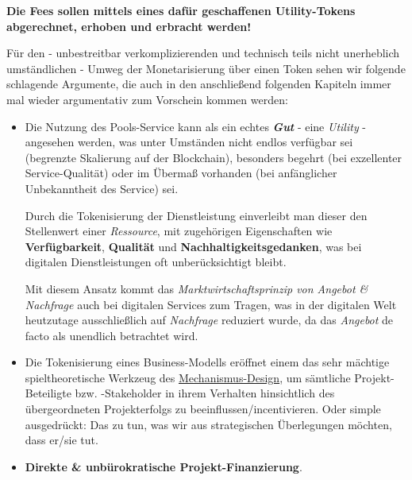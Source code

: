 \begin{Praemisse}

\vspace{0.2cm} 

\textbf{Die Fees sollen mittels eines dafür geschaffenen Utility-Tokens abgerechnet, erhoben und erbracht werden!}

\vspace{0.5cm} 

Für den - unbestreitbar verkomplizierenden und technisch teils nicht unerheblich umständlichen - Umweg der Monetarisierung über einen Token sehen wir folgende schlagende Argumente, die auch in den anschließend folgenden Kapiteln immer mal wieder argumentativ zum Vorschein kommen werden:

\begin{itemize}
	\item Die Nutzung des Pools-Service kann als ein echtes \textit{\textbf{Gut}} - eine \textit{Utility} - angesehen werden, was unter Umständen nicht endlos verfügbar sei (begrenzte Skalierung auf der Blockchain), besonders begehrt (bei exzellenter Service-Qualität) oder im Übermaß vorhanden (bei anfänglicher Unbekanntheit des Service) sei. 
	
	Durch die Tokenisierung der Dienstleistung einverleibt man dieser den Stellenwert einer \textit{Ressource}, mit zugehörigen Eigenschaften wie \textbf{Verfügbarkeit}, \textbf{Qualität} und \textbf{Nachhaltigkeitsgedanken}, was bei digitalen Dienstleistungen oft unberücksichtigt bleibt. 
	
	Mit diesem Ansatz kommt das \textit{Marktwirtschaftsprinzip von Angebot \& Nachfrage} auch bei digitalen Services zum Tragen, was in der digitalen Welt heutzutage ausschließlich auf \textit{Nachfrage} reduziert wurde, da das \textit{Angebot} de facto als unendlich betrachtet wird.
	\item Die Tokenisierung eines Business-Modells eröffnet einem das sehr mächtige spieltheoretische Werkzeug des \href{https://de.wikipedia.org/wiki/Mechanismus-Design-Theorie}{Mechanismus-Design}, um sämtliche Projekt-Beteiligte bzw. -Stakeholder in ihrem Verhalten hinsichtlich des übergeordneten Projekterfolgs zu beeinflussen/incentivieren. Oder simple ausgedrückt: Das zu tun, was wir aus strategischen Überlegungen möchten, dass er/sie tut.
	\item \textbf{Direkte \& unbürokratische Projekt-Finanzierung}.
	

\end{itemize}
\end{Praemisse}

